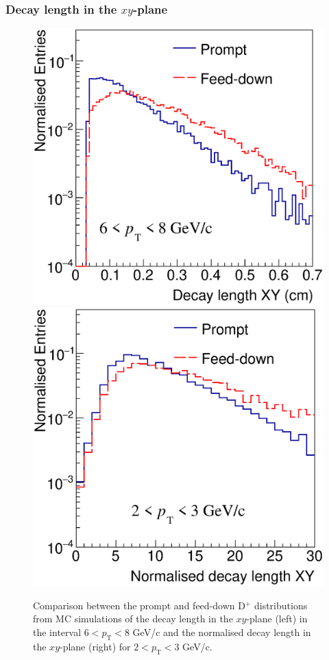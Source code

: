 \documentclass[b5paper,10pt,twoside,oldstyle,classica]{toptesi}
\newcommand{\pt}{p_\text{T}}
\begin{document}
\subsubsection{Decay length in the $xy$-plane}
\begin{figure}[tb]
\begin{center}
{\includegraphics[scale = 0.3]{CompPromptFD_DLXY_6-8.eps}}
\hspace{0cm}
{\includegraphics[scale = 0.3]{CompPromptFD_NDLXY_2-3.eps}}
\caption{Comparison between the prompt and feed-down D$^+$ distributions from MC simulations of the decay length in the $xy$-plane (left) in the interval $6<\pt<8$ GeV/c and the normalised decay length in the $xy$-plane (right) for $2<\pt<3$ GeV/c.}
\label{DecLPromptFD}
\end{center}
\end{figure}
\end{document}
